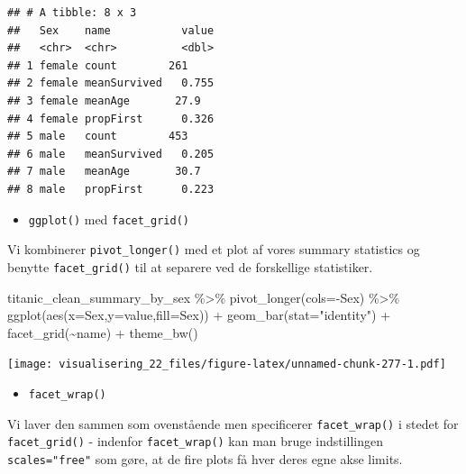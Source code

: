 \documentclass[
]{book}
\newenvironment{Shaded}{\begin{snugshade}}{\end{snugshade}}
\newcommand{\AttributeTok}[1]{\textcolor[rgb]{0.77,0.63,0.00}{#1}}
\newcommand{\FunctionTok}[1]{\textcolor[rgb]{0.00,0.00,0.00}{#1}}
\newcommand{\NormalTok}[1]{#1}
\newcommand{\SpecialCharTok}[1]{\textcolor[rgb]{0.00,0.00,0.00}{#1}}
\newcommand{\StringTok}[1]{\textcolor[rgb]{0.31,0.60,0.02}{#1}}
\providecommand{\tightlist}{%
  \setlength{\itemsep}{0pt}\setlength{\parskip}{0pt}}
\begin{document}
\begin{verbatim}
## # A tibble: 8 x 3
##   Sex    name           value
##   <chr>  <chr>          <dbl>
## 1 female count        261    
## 2 female meanSurvived   0.755
## 3 female meanAge       27.9  
## 4 female propFirst      0.326
## 5 male   count        453    
## 6 male   meanSurvived   0.205
## 7 male   meanAge       30.7  
## 8 male   propFirst      0.223
\end{verbatim}

\begin{itemize}
\tightlist
\item
  \texttt{ggplot()} med \texttt{facet\_grid()}
\end{itemize}

Vi kombinerer \texttt{pivot\_longer()} med et plot af vores summary statistics og benytte \texttt{facet\_grid()} til at separere ved de forskellige statistiker.

\begin{Shaded}
\begin{Highlighting}[]
\NormalTok{titanic\_clean\_summary\_by\_sex }\SpecialCharTok{\%\textgreater{}\%} 
  \FunctionTok{pivot\_longer}\NormalTok{(}\AttributeTok{cols=}\SpecialCharTok{{-}}\NormalTok{Sex) }\SpecialCharTok{\%\textgreater{}\%}
  \FunctionTok{ggplot}\NormalTok{(}\FunctionTok{aes}\NormalTok{(}\AttributeTok{x=}\NormalTok{Sex,}\AttributeTok{y=}\NormalTok{value,}\AttributeTok{fill=}\NormalTok{Sex)) }\SpecialCharTok{+} 
  \FunctionTok{geom\_bar}\NormalTok{(}\AttributeTok{stat=}\StringTok{"identity"}\NormalTok{) }\SpecialCharTok{+} 
  \FunctionTok{facet\_grid}\NormalTok{(}\SpecialCharTok{\textasciitilde{}}\NormalTok{name) }\SpecialCharTok{+}
  \FunctionTok{theme\_bw}\NormalTok{()}
\end{Highlighting}
\end{Shaded}

\texttt{[image: visualisering\_22\_files/figure-latex/unnamed-chunk-277-1.pdf]}

\begin{itemize}
\tightlist
\item
  \texttt{facet\_wrap()}
\end{itemize}

Vi laver den sammen som ovenstående men specificerer \texttt{facet\_wrap()} i stedet for \texttt{facet\_grid()} - indenfor \texttt{facet\_wrap()} kan man bruge indstillingen \texttt{scales="free"} som gøre, at de fire plots få hver deres egne akse limits.
\end{document}
